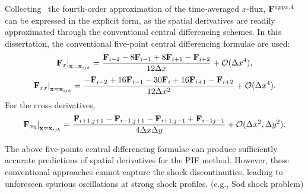 Collecting~ the fourth-order approximation of the time-averaged \( x \)-flux,
\( \mathbf{F}^{appx, 4} \) can be expressed in the explicit form, as the spatial derivatives
are readily approximated through the conventional central differencing schemes.
In this dissertation, the conventional five-point central differencing formulae are used:
\begin{equation}\label{eq:pif_central_dfdx}
    \left. \mathbf{F}_{x} \right|_{\mathbf{x} = \mathbf{x}_{ijk}} = \frac{\mathbf{F}_{i-2} - 8 \mathbf{F}_{i-1} + 8 \mathbf{F}_{i+1} - \mathbf{F}_{i+2} }{12\Delta x} + \mathcal{O}(\Delta x^{4}),
\end{equation}
\begin{equation}\label{eq:pif_central_dfdxx}
    \left. \mathbf{F}_{xx} \right|_{\mathbf{x} = \mathbf{x}_{ijk}} = \frac{-\mathbf{F}_{i-2} + 16 \mathbf{F}_{i-1} - 30 \mathbf{F}_{i} + 16 \mathbf{F}_{i+1} - \mathbf{F}_{i+2} }{12\Delta x^{2}} + \mathcal{O}(\Delta x^{4}).
\end{equation}
For the cross derivatives,
\begin{equation}\label{eq:pif_central_dfdxy}
    \left. \mathbf{F}_{xy} \right |_{\mathbf{x} = \mathbf{x}_{ijk}} =
    \frac{\mathbf{F}_{i+1, j+1} - \mathbf{F}_{i-1, j+1} - \mathbf{F}_{i+1, j-1} + \mathbf{F}_{i-1 j-1}}{4\Delta x\Delta y} + \mathcal{O}(\Delta x^{2}, \Delta y^{2}).
\end{equation}

The above five-points central differencing formulae can produce sufficiently accurate predictions
of spatial derivatives for the PIF method.
However, these conventional approaches cannot capture the shock discontinuities,
leading to unforeseen spurious oscillations
at strong shock profiles. (e.g., Sod shock problem)

